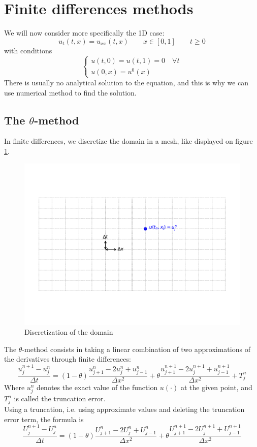 \documentclass[12pt, openany]{report}
\theoremstyle{definition}
\begin{document}
\section{Finite differences methods}
We will now consider more specifically the 1D case:
\begin{equation}
	u_t(t,x)=u_{xx}(t,x) \qquad x\in [0,1]\qquad t\ge 0
\end{equation}
with conditions 
\begin{equation}
	\begin{cases}
		u(t,0)=u(t,1) = 0 \quad \forall t\\
		u(0,x) = u^0(x)
	\end{cases}
\end{equation}
There is usually no analytical solution to the equation, and this is why we can use numerical method to find the solution. 
\subsection{The $\theta$-method}
In finite differences, we discretize the domain in a mesh, like displayed on figure \ref{fig:finite_diff}.
\begin{figure}[H]
	\centering
	\includegraphics[width = .7\textwidth]{img/finite_diff.pdf}
	\caption{Discretization of the domain}
	\label{fig:finite_diff}
\end{figure}
The $\theta$-method consists in taking a linear combination of two approximations of the derivatives through finite differences:
\begin{equation}
	\frac{u_j^{n+1}-u_j^n}{\Delta t} = (1-\theta)\frac{u_{j+1}^n-2u_j^n+u_{j-1}^n}{\Delta x^2} + \theta \frac{u_{j+1}^{n+1}-2u_{j}^{n+1}+u_{j-1}^{n+1}}{\Delta x^2} + T_j^n
\end{equation}
Where $u_j^n$ denotes the exact value of the function $u(\cdot)$ at the given point, and $T_j^n$ is called the truncation error.\\
Using a truncation, i.e. using approximate values and deleting the truncation error term, the formula is 
\begin{equation}\label{eq:theta}
	\frac{U_j^{n+1}-U_j^n}{\Delta t} = (1-\theta)\frac{U_{j+1}^n-2U_j^n+U_{j-1}^n}{\Delta x^2} + \theta \frac{U_{j+1}^{n+1}-2U_{j}^{n+1}+U_{j-1}^{n+1}}{\Delta x^2}
\end{equation}
\end{document}

